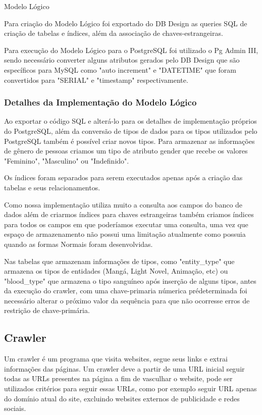 \documentclass[12pt]{article}
\begin{document}
Modelo Lógico

Para criação do Modelo Lógico foi exportado do DB Design as queries SQL de criação de tabelas e índices, além da associação de chaves-estrangeiras. 

Para execução do Modelo Lógico para o PostgreSQL foi utilizado o Pg Admin III, sendo necessário converter alguns atributos gerados pelo DB Design que são específicos para MySQL como "auto increment" e "DATETIME" que foram convertidos para "SERIAL" e "timestamp" respectivamente.


\subsubsection{Detalhes da Implementação do Modelo Lógico}

Ao exportar o código SQL e alterá-lo para os detalhes de implementação próprios do PostgreSQL, além da conversão de tipos de dados para os tipos utilizados pelo PostgreSQL também é possível criar novos tipos. Para armazenar as informações de gênero de pessoas criamos um tipo de atributo gender que recebe os valores "Feminino", "Masculino" ou "Indefinido".


Os índices foram separados para serem executados apenas após a criação das tabelas e seus relacionamentos.

Como nossa implementação utiliza muito a consulta aos campos do banco de dados além de criarmos índices para chaves estrangeiras também criamos índices para todos os campos em que poderíamos executar uma consulta, uma vez que espaço de armazenamento não possui uma limitação atualmente como possuia quando as formas Normais foram desenvolvidas.

Nas tabelas que armazenam informações de tipos, como "entity\_type" que armazena os tipos de entidades (Mangá, Light Novel, Animação, etc) ou "blood\_type" que armazena o tipo sanguíneo após inserção de alguns tipos, antes da execução do crawler, com uma chave-primaria númerica prédeterminada foi necessário alterar o próximo valor da sequência para que não ocorresse erros de restrição de chave-primária.  


\subsection{Crawler}

Um crawler é um programa que visita websites, segue seus links e extrai informações das páginas. Um crawler deve a partir de uma URL inicial seguir todas as URLs presentes na página a fim de vasculhar o website, 
pode ser utilizados critérios para seguir essas URLs, como por exemplo seguir URL apenas do domínio atual do site, excluindo websites externos de publicidade e redes sociais.
\end{document}
